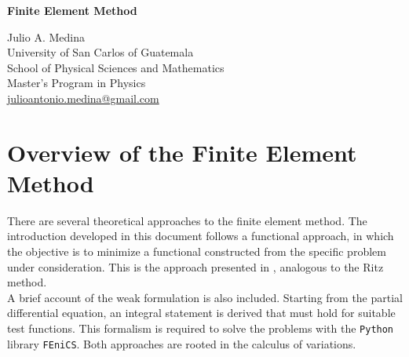 \documentclass[a4paper]{article}
\begin{document}

\Large
 \begin{center}
\textbf{Finite Element Method}\\


\hspace{10pt}

\large
Julio A. Medina\\
\hspace{10pt}
\small  
University of San Carlos of Guatemala\\
School of Physical Sciences and Mathematics\\
Master's Program in Physics\\
\href{mailto:julioantonio.medina@gmail.com}{julioantonio.medina@gmail.com}\\

\end{center}

\hspace{10pt}

\normalsize
\begin{abstract}
This report provides a theoretical introduction to the Finite Element Method (FEM) for solving partial differential equations subject to boundary conditions. It also presents relatively concise implementations for elliptic, parabolic, and hyperbolic partial differential equations. The discussion includes the tessellation, or domain-discretization, process and compares computational implementations in \texttt{Wolfram Mathematica} and \texttt{Python}.
\end{abstract}
\section{Overview of the Finite Element Method}
There are several theoretical approaches to the finite element method. The introduction developed in this document follows a functional approach, in which the objective is to minimize a functional constructed from the specific problem under consideration. This is the approach presented in \cite{Burden}, analogous to the Ritz method.\\
A brief account of the weak formulation is also included. Starting from the partial differential equation, an integral statement is derived that must hold for suitable test functions. This formalism is required to solve the problems with the \texttt{Python} library \texttt{FEniCS}. Both approaches are rooted in the calculus of variations.
\end{document}
